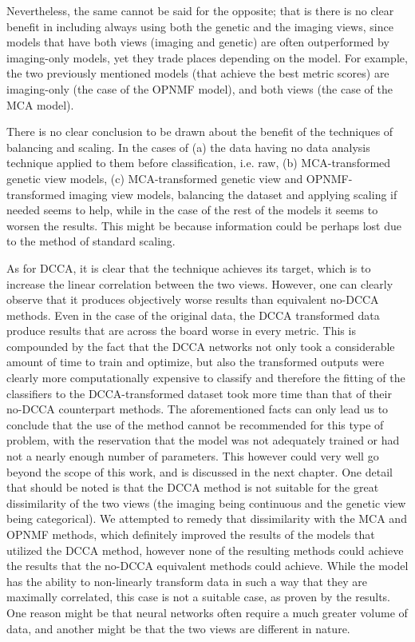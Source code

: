 {%
Nevertheless, the same cannot be said for the opposite; that is there is no clear benefit in including always using both the genetic and the imaging views, since models that have both views (imaging and genetic) are often outperformed by imaging-only models, yet they trade places depending on the model. For example, the two previously mentioned models (that achieve the best metric scores) are imaging-only (the case of the OPNMF model), and both views (the case of the MCA model). 

There is no clear conclusion to be drawn about the benefit of the techniques of balancing and scaling. In the cases of (a) the data having no data analysis technique applied to them before classification, i.e. raw, (b) MCA-transformed genetic view models, (c)  MCA-transformed genetic view and OPNMF-transformed imaging view models, balancing the dataset and applying scaling if needed seems to help, while in the case of the rest of the models it seems to worsen the results. This might be because information could be perhaps lost due to the method of standard scaling.

As for DCCA, it is clear that the technique achieves its target, which is to increase the linear correlation between the two views. However, one can clearly observe that it produces objectively worse results than equivalent no-DCCA methods. Even in the case of the original data, the DCCA transformed data produce results that are across the board worse in every metric. This is compounded by the fact that the DCCA networks not only took a considerable amount of time to train and optimize, but also the transformed outputs were clearly more computationally expensive to classify and therefore the fitting of the classifiers to the DCCA-transformed dataset took more time than that of their no-DCCA counterpart methods. The aforementioned facts can only lead us to conclude that the use of the method cannot be recommended for this type of problem, with the reservation that the model was not adequately trained or had not a nearly enough number of parameters. This however could very well go beyond the scope of this work, and is discussed in the next chapter. One detail that should be noted is that the DCCA method is not suitable for the great dissimilarity of the two views (the imaging being continuous and the genetic view being categorical). We attempted to remedy that dissimilarity with the MCA and OPNMF methods, which definitely improved the results of the models that utilized the DCCA method, however none of the resulting methods could achieve the results that the no-DCCA equivalent methods could achieve. While the model has the ability to non-linearly transform data in such a way that they are maximally correlated, this case is not a suitable case, as proven by the results. One reason might be that neural networks often require a much greater volume of data, and another might be that the two views are different in nature. 

}
